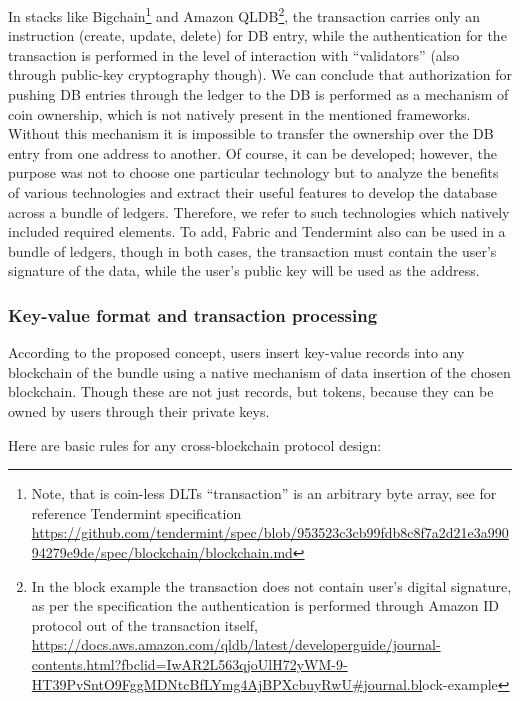 \begin{multicols}{2}
In stacks like Bigchain\footnote{Note, that is coin-less DLTs “transaction” is an arbitrary byte array, see for reference Tendermint specification \url{https://github.com/tendermint/spec/blob/953523c3cb99fdb8c8f7a2d21e3a99094279e9de/spec/blockchain/blockchain.md}} and Amazon QLDB\footnote{In the block example the transaction does not contain user’s digital signature, as per the specification the authentication is performed through Amazon ID protocol out of the transaction itself, \url{https://docs.aws.amazon.com/qldb/latest/developerguide/journal-contents.html?fbclid=IwAR2L563qjoUlH72yWM-9-HT39PvSntO9FggMDNtcBfLYmg4AjBPXcbuyRwU\#journal.bl}ock-example}, the transaction carries only an instruction (create, update, delete) for DB entry, while the authentication for the transaction is performed in the level of interaction with “validators” (also through public-key cryptography though). We can conclude that authorization for pushing DB entries through the ledger to the DB is performed as a mechanism of coin ownership, which is not natively present in the mentioned frameworks. Without this mechanism it is impossible to transfer the ownership over the DB entry from one address to another. Of course, it can be developed; however, the purpose was not to choose one particular technology but to analyze the benefits of various technologies and extract their useful features to develop the database across a bundle of ledgers. Therefore, we refer to such technologies which natively included required elements. To add, Fabric and Tendermint also can be used in a bundle of ledgers, though in both cases, the transaction must contain the user’s signature of the data, while the user’s public key will be used as the address.

\vspace{-.5cm}

\subsubsection{Key-value format and transaction processing}\label{subsubsec-4.1.b}

According to the proposed concept, users insert key-value records into any blockchain of the bundle using a native mechanism of data insertion of the chosen blockchain. Though these are not just records, but tokens, because they can be owned by users through their private keys.

Here are basic rules for any cross-blockchain protocol design:


\end{multicols}
